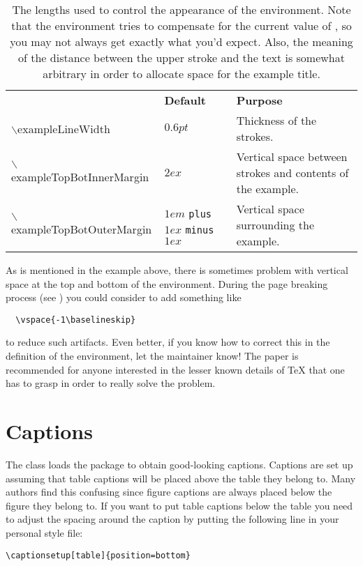 \begin{table}[tb]
  \centering
  \begin{tabular}{>{\small\ttfamily}l p{} p{}}
    \toprule
    {\normalsize\normalfont\textbf{Length}} & \textbf{Default} & \textbf{Purpose} \\
    \otoprule
    $\backslash$exampleLineWidth & $\unit{0.6}{pt}$ & Thickness of the strokes. \\
    \midrule
    $\backslash$exampleTopBotInnerMargin & $\unit{2}{ex}$ & Vertical space between strokes and contents of the example. \\
    \midrule
    $\backslash$exampleTopBotOuterMargin & $\unit{1}{em}$ \texttt{plus} $\unit{1}{ex}$ \texttt{minus} $\unit{1}{ex}$ & Vertical space surrounding the example. \\
    \bottomrule
  \end{tabular}
  \caption{\label{tab:example-lengths}%
  The lengths used to control the appearance of the  environment.  Note that the environment tries to compensate for the current value of , so you may not always get exactly what you'd expect.  Also, the meaning of the distance between the upper stroke and the text is somewhat arbitrary in order to allocate space for the example title.}
\end{table}

As is mentioned in the example above, there is sometimes problem with vertical space at the top and bottom of the  environment.  During the page breaking process (see ) you could consider to add something like
{\verbatimsize
\begin{verbatim}
  \vspace{-1\baselineskip}
\end{verbatim}}
to reduce such artifacts.  Even better, if you know how to correct this in the definition of the environment, let the \rtthesis maintainer know!  The paper \citet{RyckoJackowski93TeXIndentPar} is recommended for anyone interested in the lesser known details of \TeX{} that one has to grasp in order to really solve the problem.

\section{Captions}\label{sec:rtthesis:captions}
%
The \rtthesis class loads the  package to obtain good-looking captions.  Captions are set up assuming that table captions will be placed above the table they belong to.  Many authors find this confusing since figure captions are always placed below the figure they belong to.  If you want to put table captions below the table you need to adjust the spacing around the caption by putting the following line in your personal style file:
{\verbatimsize
\begin{verbatim}
\captionsetup[table]{position=bottom}
\end{verbatim}}

